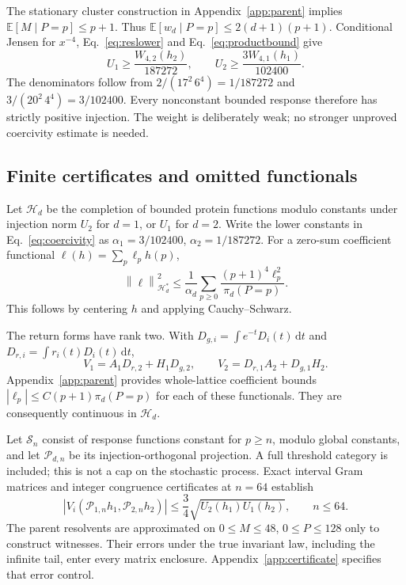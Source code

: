 \documentclass[11pt]{article}
\newcommand{\E}{\mathbb E}
\newcommand{\dd}{\,\mathrm dt}
\newcommand{\norm}[1]{\left\lVert #1\right\rVert}
\begin{document}
The stationary cluster construction in Appendix~\ref{app:parent}
implies $\E[M\mid P=p]\leq p+1$. Thus
$\E[w_d\mid P=p]\leq2(d+1)(p+1)$. Conditional Jensen for $x^{-4}$,
Eq.~\eqref{eq:reslower} and Eq.~\eqref{eq:productbound} give
\begin{equation}
 U_1\geq\frac{W_{4,2}(h_2)}{187272},
 \qquad
 U_2\geq\frac{3W_{4,1}(h_1)}{102400}.
 \label{eq:coercivity}
\end{equation}
The denominators follow from
$2/(17^2\,6^4)=1/187272$ and $3/(20^2\,4^4)=3/102400$.
Every nonconstant bounded response therefore has strictly positive
injection. The weight is deliberately weak; no stronger unproved
coercivity estimate is needed.

\subsection{Finite certificates and omitted functionals}

Let $\mathcal H_d$ be the completion of bounded protein functions
modulo constants under injection norm $U_2$ for $d=1$, or $U_1$
for $d=2$. Write the lower constants in Eq.~\eqref{eq:coercivity} as
$\alpha_1=3/102400$, $\alpha_2=1/187272$.
For a zero-sum coefficient functional $\ell(h)=\sum_p\ell_ph(p)$,
\begin{equation}
 \norm{\ell}_{\mathcal H_d^*}^2
 \leq\frac1{\alpha_d}
       \sum_{p\geq0}\frac{(p+1)^4\ell_p^2}{\pi_d(P=p)}.
 \label{eq:dual}
\end{equation}
This follows by centering $h$ and applying Cauchy--Schwarz.

The return forms have rank two. With
$D_{g,i}=\int e^{-t}D_i(t)\dd$ and
$D_{r,i}=\int r_i(t)D_i(t)\dd$,
\begin{equation}
 V_1=A_1D_{r,2}+H_1D_{g,2},\qquad
 V_2=D_{r,1}A_2+D_{g,1}H_2.
 \label{eq:ranktwo}
\end{equation}
Appendix~\ref{app:parent} provides whole-lattice coefficient bounds
$|\ell_p|\leq C(p+1)\pi_d(P=p)$ for each of these functionals.
They are consequently continuous in $\mathcal H_d$.

Let $\mathcal S_n$ consist of response functions constant for $p\geq n$,
modulo global constants, and let $\mathcal P_{d,n}$ be its
injection-orthogonal projection. A full threshold category is included;
this is not a cap on the stochastic process. Exact interval Gram matrices
and integer congruence certificates at $n=64$ establish
\begin{equation}
 |V_i(\mathcal P_{1,n}h_1,\mathcal P_{2,n}h_2)|
 \leq\frac34\sqrt{U_2(h_1)U_1(h_2)},\qquad n\leq64.
 \label{eq:finitebound}
\end{equation}
The parent resolvents are approximated on $0\leq M\leq48$,
$0\leq P\leq128$ only to construct witnesses. Their errors under the
true invariant law, including the infinite tail, enter every matrix
enclosure. Appendix~\ref{app:certificate} specifies that error control.
\end{document}
